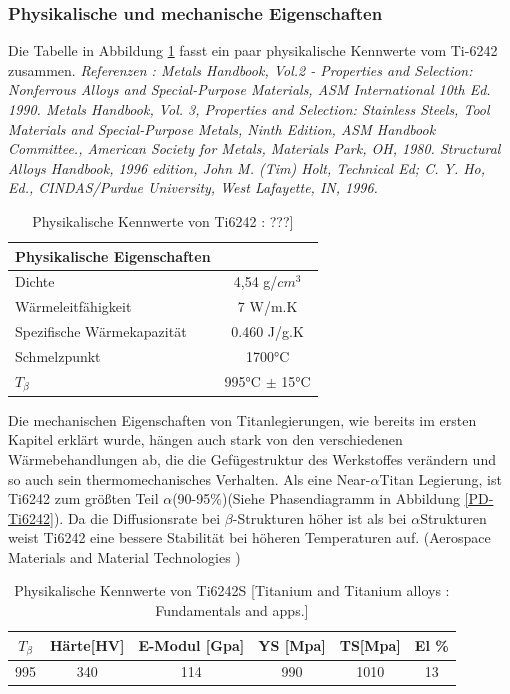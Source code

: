 \subsubsection{ Physikalische und mechanische Eigenschaften }

Die Tabelle in Abbildung \ref{Phy.eig.} fasst ein paar physikalische Kennwerte vom Ti-6242 zusammen.
\newline
\textit{	Referenzen : 
	Metals Handbook, Vol.2 - Properties and Selection: Nonferrous Alloys and Special-Purpose Materials, ASM International 10th Ed. 1990.				
	Metals Handbook, Vol. 3, Properties and Selection: Stainless Steels, Tool Materials and Special-Purpose Metals, Ninth Edition, ASM Handbook Committee., American Society for Metals, Materials Park, OH, 1980.				
	Structural Alloys Handbook, 1996 edition, John M. (Tim) Holt, Technical Ed; C. Y. Ho, Ed., CINDAS/Purdue University, West Lafayette, IN, 1996. }

\begin{table}[H]
	\centering	
	\begin{tabular}{l c}
		
		Physikalische Eigenschaften & \\
		\hline
		Dichte& 4,54 g/$cm^3$\\
		Wärmeleitfähigkeit & 7 W/m.K \\
		Spezifische Wärmekapazität & 0.460 J/g.K\\
		Schmelzpunkt & 1700°C \\
		$T_{\beta}$ &  995°C $\pm$ 15°C \\
		\hline
		
	\end{tabular}
	\caption{Physikalische Kennwerte von Ti6242 : ???]}
	\label{Phy.eig.}
\end{table}


Die mechanischen Eigenschaften von Titanlegierungen, wie bereits im ersten Kapitel erklärt wurde, hängen auch stark von den verschiedenen Wärmebehandlungen ab, die die Gefügestruktur des Werkstoffes  verändern und so auch sein thermomechanisches Verhalten.
Als eine Near-$\alpha$Titan Legierung, ist Ti6242 zum größten Teil $\alpha$(90-95\%)(Siehe Phasendiagramm in Abbildung \ref{PD-Ti6242}). Da die Diffusionsrate bei $\beta$-Strukturen höher ist als bei $\alpha$Strukturen weist Ti6242 eine bessere Stabilität bei höheren Temperaturen auf. (Aerospace Materials and Material Technologies ) 

\begin{table}[H]
	\centering	
	\begin{tabular}{|c| c| c| c| c| c|}										
		\hline
		$T_{\beta}$ & Härte[HV] & E-Modul [Gpa]& YS [Mpa]&TS[Mpa]& El \% \\
		\hline
		995&340&114&990&1010&13\\
		\hline
	\end{tabular}
	\caption{Physikalische Kennwerte von Ti6242S [Titanium and Titanium alloys  : Fundamentals and apps.]}
	\label{Mec.}
\end{table}

